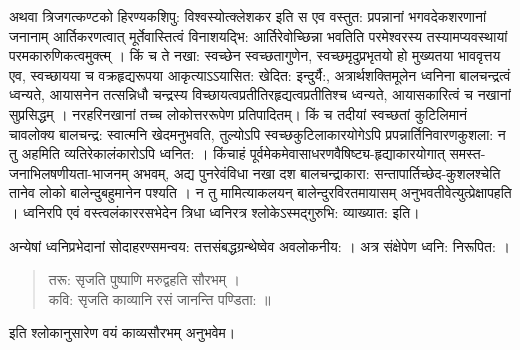 {अथवा त्रिजगत्कण्टको हिरण्यकशिपु: विश्वस्योत्क्लेशकर इति स एव वस्तुत: प्रपन्नानां भगवदेकशरणानां जनानाम् आर्तिकरणत्वात् मूर्तेवास्तित्वं विनाशयद्भि: आर्तिरेवोच्छिन्ना भवतिति परमेश्वरस्य तस्यामप्यवस्थायां परमकारुणिकत्वमुक्त्म् । किं च ते नखा: स्वच्छेन स्वच्छतागुणेन, स्वच्छमृदुप्रभृतयो हो मुख्यतया भाववृत्तय एव, स्वच्छायया च वक्रहृद्यरूपया आकृत्याऽऽयासित: खेदित: इन्दुर्यै:, अत्रार्थशक्तिमूलेन ध्वनिना बालचन्द्रत्वं ध्वन्यते, आयासनेन तत्सन्निधौ चन्द्रस्य विच्छायत्वप्रतीतिरहृद्यत्वप्रतीतिश्च ध्वन्यते, आयासकारित्वं च नखानां सुप्रसिद्धम् । नरहरिनखानां तच्च लोकोत्तररूपेण प्रतिपादितम्। किं च तदीयां स्वच्छतां कुटिलिमानं चावलोक्य बालचन्द्र: स्वात्मनि खेदमनुभवति, तुल्योऽपि स्वच्छकुटिलाकारयोगेऽपि प्रपन्नार्तिनिवारणकुशला: न तु अहमिति व्यतिरेकालंकारोऽपि ध्वनित: । किंचाहं पूर्वमेकमेवासाधरणवैषिष्ट्य-हृद्याकारयोगात् समस्त-जनाभिलषणीयता-भाजनम् अभवम्, अद्य पुनरेवंविधा नखा दश बालचन्द्राकारा: सन्तापार्तिच्छेद-कुशलश्चेति तानेव लोको बालेन्दुबहुमानेन पश्यति । न तु मामित्याकलयन् बालेन्दुरविरतमायासम् अनुभवतीवेत्युत्प्रेक्षापहति । ध्वनिरपि एवं वस्त्वलंकाररसभेदेन त्रिधा ध्वनिरत्र श्लोकेऽस्मद्गुरुभि: व्याख्यात: इति।

अन्येषां ध्वनिप्रभेदानां सोदाहरण्समन्वय: तत्तसंबद्धग्रन्थेष्वेव अवलोकनीय: । अत्र संक्षेपेण ध्वनि: निरूपित: । 
\begin{verse}
तरू: सृजति पुष्पाणि मरुद्वहति सौरभम् ।\\
कवि: सृजति काव्यानि रसं जानन्ति पण्डिता: ॥
\end{verse}
इति श्लोकानुसारेण वयं काव्यसौरभम् अनुभवेम।

\articleend
}
